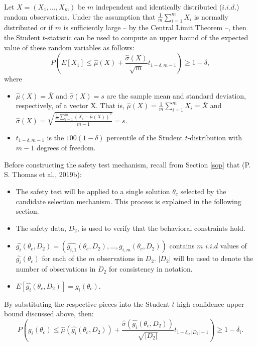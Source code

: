 \documentclass[12pt, twoside]{amherstthesis}
\begin{document}
Let \(X = (X_1, \ldots, X_m)\) be \(m\) independent and identically distributed (\(i.i.d.\)) random observations. Under the assumption that \(\frac{1}{m} \sum_{i=1}^m X_i\) is normally distributed or if \(m\) is sufficiently large -- by the Central Limit Theorem --, then the Student \(t\)-statistic can be used to compute an upper bound of the expected value of these random variables as follows:
\begin{equation}
\label{ch2eq10}
P(E[X_1] \leq \hat{\mu}(X) + \frac{\hat{\sigma}(X)}{\sqrt{m}}t_{1-\delta, m-1}) \geq 1 - \delta,
\end{equation}
where
\begin{itemize}
\item
  \(\hat{\mu}(X) = \bar{X}\) and \(\hat{\sigma}(X) = s\) are the sample mean and standard deviation, respectively, of a vector X. That is, \(\hat{\mu}(X) = \frac{1}{m}\sum_{i=1}^m X_i = \bar{X}\) and \(\hat{\sigma}(X) = \sqrt{\frac{\frac{1}{m}\sum_{i=1}^m (X_i - \hat{\mu}(X))^2}{m-1}} = s\).
\item
  \(t_{1-\delta, m-1}\) is the \(100(1-\delta)\) percentile of the Student \(t\)-distribution with \(m-1\) degrees of freedom.
\end{itemize}
Before constructing the safety test mechanism, recall from Section \ref{sop} that (P. S. Thomas et al., 2019b):
\begin{itemize}
\item
  The safety test will be applied to a single solution \(\theta_c\) selected by the candidate selection mechanism. This process is explained in the following section.
\item
  The safety data, \(D_2\), is used to verify that the behavioral constraints hold.
\item
  \(\hat{g_i}(\theta_c, D_2) = (\hat{g_{i,1}}(\theta_c, D_2), \ldots,\hat{g_{i,m}}(\theta_c, D_2))\) contains \(m\) \(i.i.d\) values of \(\hat{g_i}(\theta_c)\) for each of the \(m\) observations in \(D_2\). \(|D_2|\) will be used to denote the number of observations in \(D_2\) for consistency in notation.
\item
  \(E[\hat{g_i}(\theta_c, D_2)] = g_i(\theta_c)\).
\end{itemize}
By substituting the respective pieces into the Student \(t\) high confidence upper bound discussed above, then:
\begin{equation}
\label{ch2eq11}
P(g_i(\theta_c) \leq \hat{\mu}(\hat{g_i}(\theta_c, D_2)) + \frac{\hat{\sigma}(\hat{g_i}(\theta_c, D_2))}{\sqrt{|D_2|}}t_{1-\delta_i, |D_2|-1}) \geq 1 - \delta_i.
\end{equation}
\end{document}
